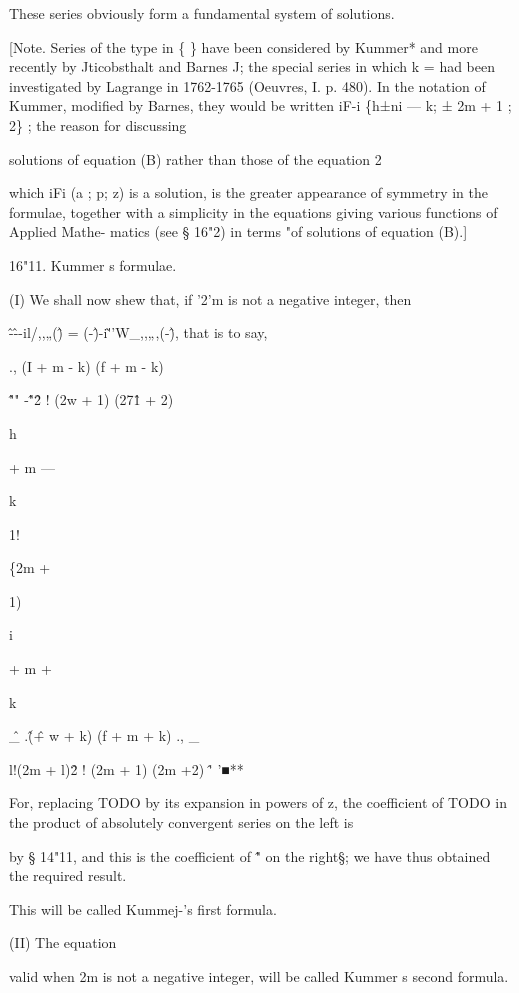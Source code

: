 These series obviously form a fundamental system of solutions. 

[Note. Series of the type in \{ \} have been considered by Kummer* and more recently 
by Jticobsthalt and Barnes J; the special series in which k = had been investigated by 
Lagrange in 1762-1765 (Oeuvres, I. p. 480). In the notation of Kummer, modified by 
Barnes, they would be written iF-i \{h±ni — k; ± 2m + 1 ; 2\} ; the reason for discussing 

solutions of equation (B) rather than those of the equation 2 

which iFi (a ; p; z) is a solution, is the greater appearance of symmetry in the formulae, 
together with a simplicity in the equations giving various functions of Applied Mathe- 
matics (see § 16"2) in terms "of solutions of equation (B).] 

16"11. Kummer s formulae. 

(I) We shall now shew that, if '2'm is not a negative integer, then 

\^-\^--il/,,„(\^) = (-\^)-i\~''W\_,,„,(-\^), 
that is to say, 

., (I + m - k) (f + m - k) 

\^ "" -\^"\^ 2 ! (2w + 1) (27\^1 + 2) 



h 


+ m — 


k 


1! 


\{2m + 


1) 


i 


+ m + 


k 



\^ \_ .\^ (\^ + w + k) (f + m + k) ., \_ 

l!(2m + l)\^ 2 ! (2m + 1) (2m +2) \^' '■** 

For, replacing TODO by its expansion in powers of z, the coefficient of TODO in 
the product of absolutely convergent series on the left is 


by § 14"11, and this is the coefficient of \^" on the right§; we have thus 
obtained the required result. 

This will be called Kummej-'s first formula. 

(II) The equation 



valid when 2m is not a negative integer, will be called Kummer s second 
formula. 

